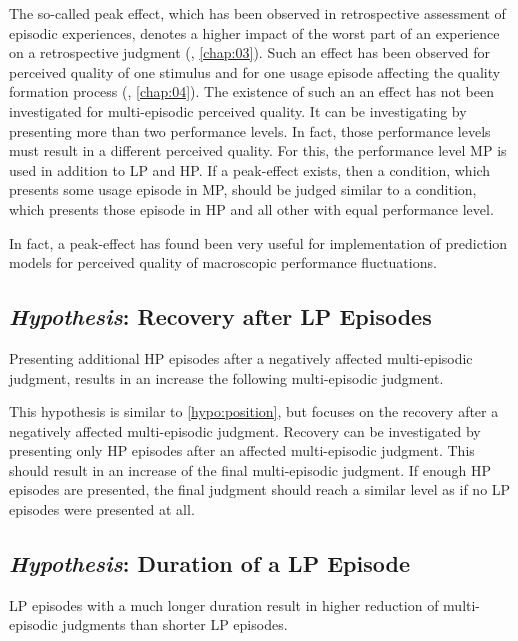 The so-called peak effect, which has been observed in retrospective assessment of episodic experiences, denotes a higher impact of the worst part of an experience on a retrospective judgment (\cf, \autoref{chap:03}).
Such an effect has been observed for perceived quality of one stimulus and for one usage episode affecting the quality formation process (\cf, \autoref{chap:04}).
The existence of such an an effect has not been investigated for multi-episodic perceived quality.
It can be investigating by presenting more than two performance levels.
In fact, those performance levels must result in a different perceived quality.
For this, the performance level \ac{MP} is used in addition to \ac{LP} and \ac{HP}.
If a peak-effect exists, then a condition, which presents some usage episode in \ac{MP}, should be judged similar to a condition, which presents those episode in \ac{HP} and all other with equal performance level.

In fact, a peak-effect has found been very useful for implementation of prediction models for perceived quality of macroscopic performance fluctuations.

\subsection{\emph{Hypothesis}: Recovery after \acs{LP} Episodes}
\begin{hypothesis}\label{hypo:recovery}
Presenting additional \ac{HP} episodes after a negatively affected multi-episodic judgment, results in an increase the following multi-episodic judgment.
\end{hypothesis}

This hypothesis is similar to \autoref{hypo:position}, but focuses on the recovery after a negatively affected multi-episodic judgment.
Recovery can be investigated by presenting only \ac{HP} episodes after an affected multi-episodic judgment.
This should result in an increase of the final multi-episodic judgment.
If enough \ac{HP} episodes are presented, the final judgment should reach a similar level as if no \ac{LP} episodes were presented at all.

\subsection{\emph{Hypothesis}: Duration of a \acs{LP} Episode}
\begin{hypothesis}\label{hypo:duration}
\ac{LP} episodes with a much longer duration result in higher reduction of multi-episodic judgments than shorter \ac{LP} episodes.
\end{hypothesis}

